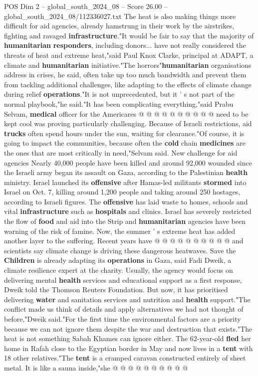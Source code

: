\begin{textsample}{POS Dim 2 – global\_south\_2024\_08 – Score 26.00 – global\_south\_2024\_08/112336027.txt}
The heat is also making things more difficult for aid agencies, already hamstrung in their work by the airstrikes, fighting and ravaged \textbf{infrastructure}."It would be fair to say that the majority of \textbf{humanitarian} \textbf{responders}, including donors... have not really considered the threats of heat and extreme heat,"said Paul Knox Clarke, principal at ADAPT, a climate and \textbf{humanitarian} initiative."The horrors"\textbf{humanitarian} organisations address in crises, he said, often take up too much bandwidth and prevent them from tackling additional challenges, like adapting to the effects of climate change during relief \textbf{operations}."It is not unprecedented, but it ' s not part of the normal playbook,"he said."It has been complicating everything,"said Prabu Selvam, \textbf{medical} officer for the Americares @ @ @ @ @ @ @ @ @ @ need to be kept cool was proving particularly challenging.
Because of Israeli restrictions, aid \textbf{trucks} often spend hours under the sun, waiting for clearance."Of course, it is going to impact the communities, because often the \textbf{cold} chain \textbf{medicines} are the ones that are most critically in need,"Selvam said.
New challenge for aid agencies Nearly 40,000 people have been killed and around 92,000 wounded since the Israeli army began its assault on Gaza, according to the Palestinian \textbf{health} ministry.
Israel launched its \textbf{offensive} after Hamas-led militants \textbf{stormed} into Israel on Oct. 7, killing around 1,200 people and taking around 250 hostages, according to Israeli figures.
The \textbf{offensive} has laid waste to homes, schools and vital \textbf{infrastructure} such as \textbf{hospitals} and clinics.
Israel has severely restricted the flow of \textbf{food} and aid into the Strip and \textbf{humanitarian} agencies have been warning of the risk of famine.
Now, the summer ' s extreme heat has added another layer to the suffering.
Recent years have @ @ @ @ @ @ @ @ @ @ and scientists say climate change is driving these dangerous heatwaves.
Save the \textbf{Children} is already adapting its \textbf{operations} in Gaza, said Fadi Dweik, a climate resilience expert at the charity.
Usually, the agency would focus on delivering mental \textbf{health} services and educational support as a first response, Dweik told the Thomson Reuters Foundation.
But now, it has prioritised delivering \textbf{water} and sanitation services and nutrition and \textbf{health} support."The conflict made us think of details and apply alternatives we had not thought of before,"Dweik said."For the first time the environmental factors are a priority because we can not ignore them despite the war and destruction that exists."The heat is not something Sabah Khames can ignore either.
The 62-year-old \textbf{fled} her home in Rafah close to the Egyptian border in May and now lives in a \textbf{tent} with 18 other relatives."The \textbf{tent} is a cramped caravan constructed entirely of sheet metal.
It is like a sauna inside,"she @ @ @ @ @ @ @ @ @ @


\end{textsample}
